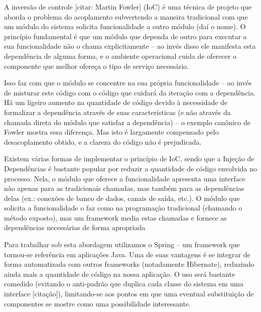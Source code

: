 \documentclass[12pt,twoside]{article}
\begin{document}
{\upshape
A invers\~ao de controle [citar: Martin Fowler] (IoC) \'e uma t\'ecnica
de projeto que aborda o problema do acoplamento subvertendo a maneira
tradicional com que um m\'odulo do sistema solicita funcionalidade a
outro m\'odulo (da\'i o nome). O princ\'ipio fundamental \'e que um
m\'odulo que dependa de outro para executar a sua funcionalidade n\~ao
o chama explicitamente {--} ao inv\'es disso ele manifesta esta
depend\^encia de alguma forma, e o ambiente operacional cuida de
oferecer o componente que melhor ofere\c{c}a o tipo de servi\c{c}o
necess\'ario.}

{\upshape
Isso faz com que o m\'odulo se concentre na sua pr\'opria funcionalidade
{--} ao inv\'es de misturar este c\'odigo com o c\'odigo que cuidar\'a
da itera\c{c}\~ao com a depend\^encia. H\'a um ligeiro aumento na
quantidade de c\'odigo devido \`a necessidade de formalizar a
depend\^encia atrav\'es de suas caracter\'isticas (e n\~ao atrav\'es da
chamada direta do m\'odulo que satisfaz a depend\^encia) {--} o exemplo
can\^onico de Fowler mostra essa diferen\c{c}a. Mas isto \'e largamente
compensado pelo desacoplamento obtido, e a clareza do c\'odigo n\~ao
\'e prejudicada.}

{\upshape
Existem v\'arias formas de implementar o princ\'ipio de IoC, sendo que a
Inje\c{c}\~ao de Depend\^encias \'e bastante popular por reduzir a
quantidade de c\'odigo envolvida no processo. Nela, o m\'odulo que
oferece a funcionalidade apresenta uma interface n\~ao apenas para as
tradicionais chamadas, mas tamb\'em para as depend\^encias delas (ex.:
conex\~oes de banco de dados, canais de sa\'ida, etc.). O m\'odulo que
solicita a funcionalidade o faz como na programa\c{c}\~ao tradicional
(chamando o m\'etodo exposto), mas um framework media estas chamadas e
fornece as depend\^encias necess\'arias de forma apropriada}

{\upshape
Para trabalhar sob esta abordagem utilizamos o Spring {--} um framework
que tornou{}-se refer\^encia em aplica\c{c}\~oes Java. Uma de suas
vantagens \'e se integrar de forma automatizada com outros frameworks
(notadamente Hibernate), reduzindo ainda mais a quantidade de c\'odigo
na nossa aplica\c{c}\~ao. O uso ser\'a bastante comedido (evitando o
anti{}-padr\~ao que duplica cada classe do sistema em uma interface
[cita\c{c}\~ao]), limitando{}-se aos pontos em que uma eventual
substitui\c{c}\~ao de componentes se mostre como uma possibilidade
interessante.}

\subparagraph{}

\bigskip
\end{document}
